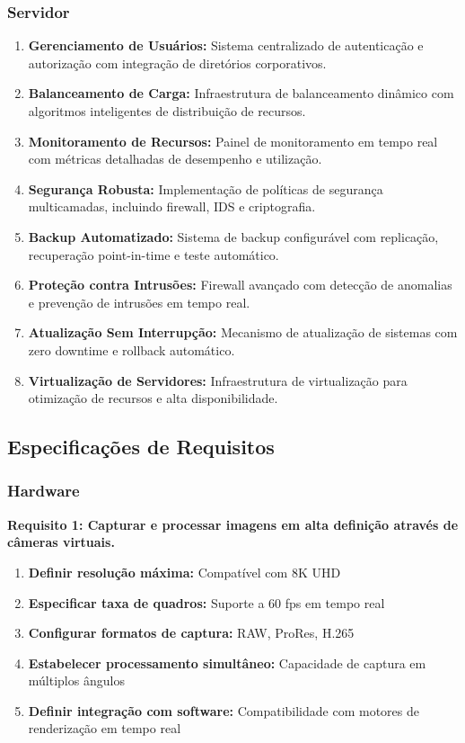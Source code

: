 \subsubsection{Servidor}
\begin{enumerate}[leftmargin=*]
    \item \textbf{Gerenciamento de Usuários:} Sistema centralizado de autenticação e autorização com integração de diretórios corporativos.
    \item \textbf{Balanceamento de Carga:} Infraestrutura de balanceamento dinâmico com algoritmos inteligentes de distribuição de recursos.
    \item \textbf{Monitoramento de Recursos:} Painel de monitoramento em tempo real com métricas detalhadas de desempenho e utilização.
    \item \textbf{Segurança Robusta:} Implementação de políticas de segurança multicamadas, incluindo firewall, IDS e criptografia.
    \item \textbf{Backup Automatizado:} Sistema de backup configurável com replicação, recuperação point-in-time e teste automático.
    \item \textbf{Proteção contra Intrusões:} Firewall avançado com detecção de anomalias e prevenção de intrusões em tempo real.
    \item \textbf{Atualização Sem Interrupção:} Mecanismo de atualização de sistemas com zero downtime e rollback automático.
    \item \textbf{Virtualização de Servidores:} Infraestrutura de virtualização para otimização de recursos e alta disponibilidade.
\end{enumerate}

\subsection{Especificações de Requisitos}

\subsubsection{Hardware}
\textbf{Requisito 1: Capturar e processar imagens em alta definição através de câmeras virtuais.}
\begin{enumerate}[leftmargin=*]
    \item \textbf{Definir resolução máxima:} Compatível com 8K UHD
    \item \textbf{Especificar taxa de quadros:} Suporte a 60 fps em tempo real
    \item \textbf{Configurar formatos de captura:} RAW, ProRes, H.265
    \item \textbf{Estabelecer processamento simultâneo:} Capacidade de captura em múltiplos ângulos
    \item \textbf{Definir integração com software:} Compatibilidade com motores de renderização em tempo real
\end{enumerate}

